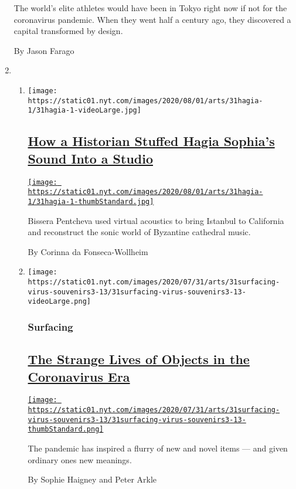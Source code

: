 \begin{enumerate}
  The world's elite athletes would have been in Tokyo right now if not
  for the coronavirus pandemic. When they went half a century ago, they
  discovered a capital transformed by design.

  By Jason Farago
\item
  \begin{enumerate}
  \def\labelenumii{\arabic{enumii}.}
  \item
    \texttt{[image: https://static01.nyt.com/images/2020/08/01/arts/31hagia-1/31hagia-1-videoLarge.jpg]}

    \hypertarget{how-a-historian-stuffed-hagia-sophias-sound-into-a-studio}{%
    \subsection{\texorpdfstring{\href{/2020/07/30/arts/music/hagia-sophia-acoustics-music.html}{How
    a Historian Stuffed Hagia Sophia's Sound Into a
    Studio}}{How a Historian Stuffed Hagia Sophia's Sound Into a Studio}}\label{how-a-historian-stuffed-hagia-sophias-sound-into-a-studio}}

    \href{/2020/07/30/arts/music/hagia-sophia-acoustics-music.html}{\texttt{[image: https://static01.nyt.com/images/2020/08/01/arts/31hagia-1/31hagia-1-thumbStandard.jpg]}}

    Bissera Pentcheva used virtual acoustics to bring Istanbul to
    California and reconstruct the sonic world of Byzantine cathedral
    music.

    By Corinna da Fonseca-Wollheim
  \item
    \texttt{[image: https://static01.nyt.com/images/2020/07/31/arts/31surfacing-virus-souvenirs3-13/31surfacing-virus-souvenirs3-13-videoLarge.png]}

    \hypertarget{surfacing}{%
    \subsubsection{Surfacing}\label{surfacing}}

    \hypertarget{the-strange-lives-of-objects-in-the-coronavirus-era}{%
    \subsection{\texorpdfstring{\href{/2020/08/01/arts/design/virus-design-objects.html}{The
    Strange Lives of Objects in the Coronavirus
    Era}}{The Strange Lives of Objects in the Coronavirus Era}}\label{the-strange-lives-of-objects-in-the-coronavirus-era}}

    \href{/2020/08/01/arts/design/virus-design-objects.html}{\texttt{[image: https://static01.nyt.com/images/2020/07/31/arts/31surfacing-virus-souvenirs3-13/31surfacing-virus-souvenirs3-13-thumbStandard.png]}}

    The pandemic has inspired a flurry of new and novel items --- and
    given ordinary ones new meanings.

    By Sophie Haigney and Peter Arkle
  \end{enumerate}
\end{enumerate}

